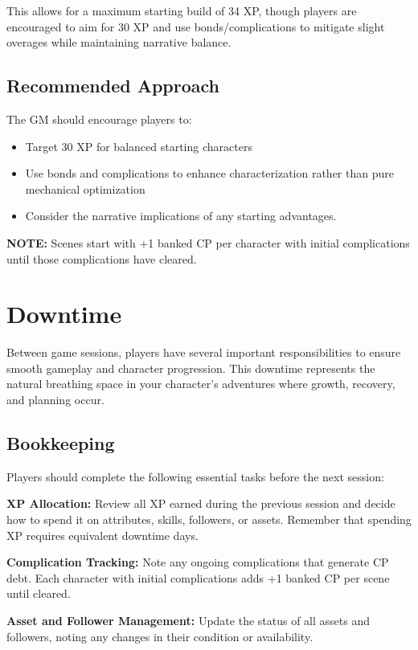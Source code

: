 This allows for a maximum starting build of 34 XP, though players are encouraged to aim for 30 XP and use bonds/complications to mitigate slight overages while maintaining narrative balance.

\subsection{Recommended Approach}

The GM should encourage players to:
\begin{itemize}
    \item Target 30 XP for balanced starting characters
    \item Use bonds and complications to enhance characterization rather than pure mechanical optimization
    \item Consider the narrative implications of any starting advantages.
\end{itemize}
\textbf{NOTE:} Scenes start with +1 banked CP per character with initial complications until those complications have cleared.

\section{Downtime}

Between game sessions, players have several important responsibilities to ensure smooth gameplay and character progression. This downtime represents the natural breathing space in your character's adventures where growth, recovery, and planning occur.

\subsection{Bookkeeping}

Players should complete the following essential tasks before the next session:

\textbf{XP Allocation:} Review all XP earned during the previous session and decide how to spend it on attributes, skills, followers, or assets. Remember that spending XP requires equivalent downtime days.

\textbf{Complication Tracking:} Note any ongoing complications that generate CP debt. Each character with initial complications adds +1 banked CP per scene until cleared.

\textbf{Asset and Follower Management:} Update the status of all assets and followers, noting any changes in their condition or availability.

